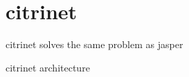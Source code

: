 \documentclass[aspectratio=169,xcolor={dvipsnames,svgnames}]{beamer}
\begin{document}
\section{citrinet}
\label{sec:org3abab1b}
\begin{frame}[label={sec:orgeb65559}]{citrinet}
solves the same problem as jasper
\end{frame}
\begin{frame}[label={sec:org683768e}]{citrinet architecture}
\begin{columns}
\begin{column}{0.45\columnwidth}
\only<+->{

}
\end{column}
\end{columns}
\end{frame}
\end{document}
